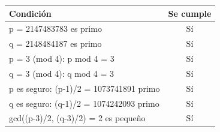 \begin{tabular}{lc}
\toprule
Condición & Se cumple \\
\midrule
p = 2147483783 es primo & Sí \\
q = 2148484187 es primo & Sí \\
p = 3 (mod 4): p mod 4 = 3 & Sí \\
q = 3 (mod 4): q mod 4 = 3 & Sí \\
p es seguro: (p-1)/2 = 1073741891 primo & Sí \\
q es seguro: (q-1)/2 = 1074242093 primo & Sí \\
gcd((p-3)/2, (q-3)/2) = 2 es pequeño & Sí \\
\bottomrule
\end{tabular}
